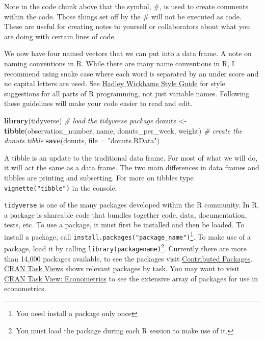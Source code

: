 \documentclass[]{book}
\newenvironment{Shaded}{\begin{snugshade}}{\end{snugshade}}
\newcommand{\CommentTok}[1]{\textcolor[rgb]{0.56,0.35,0.01}{\textit{#1}}}
\newcommand{\DataTypeTok}[1]{\textcolor[rgb]{0.13,0.29,0.53}{#1}}
\newcommand{\KeywordTok}[1]{\textcolor[rgb]{0.13,0.29,0.53}{\textbf{#1}}}
\newcommand{\NormalTok}[1]{#1}
\newcommand{\StringTok}[1]{\textcolor[rgb]{0.31,0.60,0.02}{#1}}
\let\rmarkdownfootnote\footnote%
\def\footnote{\protect\rmarkdownfootnote}
\begin{document}
Note in the code chunk above that the symbol, \#, is used to create comments within the code. Those things set off by the \# will not be executed as code. These are useful for creating notes to yourself or collaborators about what you are doing with certain lines of code.

We now have four named vectors that we can put into a data frame. A note on naming conventions in R. While there are many name conventions in R, I recommend using snake case where each word is separated by an under score and no capital letters are used. See \href{http://adv-r.had.co.nz/Style.html}{Hadley Wickhams Style Guide} for style suggestions for all parts of R programming, not just variable names. Following these guidelines will make your code easier to read and edit.

\begin{Shaded}
\begin{Highlighting}[]
\KeywordTok{library}\NormalTok{(tidyverse) }\CommentTok{# load the tidyverse package}
\NormalTok{donuts <-}\StringTok{ }\KeywordTok{tibble}\NormalTok{(observation_number, name, donuts_per_week, weight) }\CommentTok{# create the donuts tibble}
\KeywordTok{save}\NormalTok{(donuts, }\DataTypeTok{file =} \StringTok{"donuts.RData"}\NormalTok{)}
\end{Highlighting}
\end{Shaded}

A tibble is an update to the traditional data frame. For most of what we will do, it will act the same as a data frame. The two main differences in data frames and tibbles are printing and subsetting. For more on tibbles type \texttt{vignette("tibble")} in the console.

\texttt{tidyverse} is one of the many packages developed within the R community. In R, a package is shareable code that bundles together code, data, documentation, tests, etc. To use a package, it must first be installed and then be loaded. To install a package, call \texttt{install.packages("package\_name")}\footnote{You need install a package only once}. To make use of a package, load it by calling \texttt{library(packagename)}\footnote{You must load the package during each R session to make use of it.}. Currently there are more than 14,000 packages available, to see the packages visit \href{https://cran.r-project.org/web/packages/}{Contributed Packages}. \href{https://cran.r-project.org/web/views/}{CRAN Task Views} shows relevant packages by task. You may want to visit \href{https://cran.r-project.org/web/views/Econometrics.html}{CRAN Task View: Econometrics} to see the extensive array of packages for use in econometrics.
\end{document}
